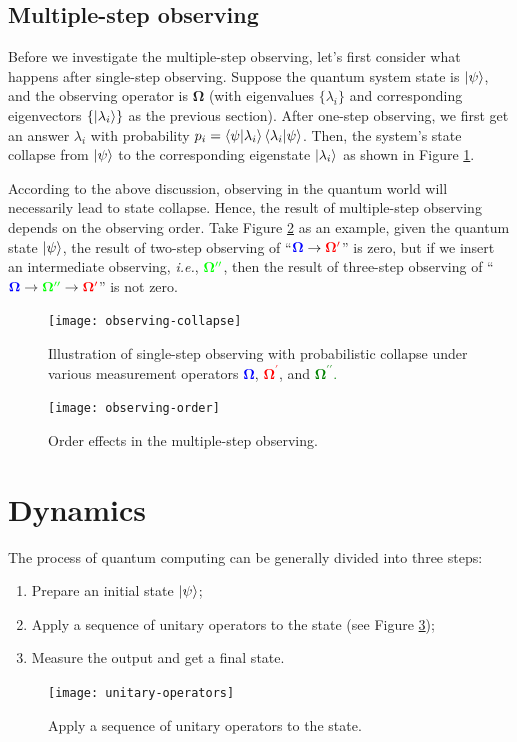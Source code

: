\documentclass{easyclass}
\begin{document}
\subsection{Multiple-step observing}
Before we investigate the multiple-step observing, let's first consider what happens after single-step observing. Suppose the quantum system state is $\ket{\psi}$, and the observing operator is $\mathbf{\Omega}$ (with eigenvalues $\{\lambda_i\}$ and corresponding eigenvectors $\{\ket{\lambda_i}\}$ as the previous section). After one-step observing, we first get an answer $\lambda_i$ with probability $p_i=\braket{\psi|\lambda_i}\braket{\lambda_i|\psi}$. Then, the system's state collapse from $\ket{\psi}$ to the corresponding eigenstate $\ket{\lambda_i}$ as shown in Figure \ref{fig:observing-collapse}.

According to the above discussion, observing in the quantum world will necessarily lead to state collapse. Hence, the result of multiple-step observing depends on the observing order. Take Figure \ref{fig:observing-order} as an example, given the quantum state $\ket{\psi}$, the result of two-step observing of ``$\textcolor{blue}{\mathbf{\Omega}}\rightarrow\textcolor{red}{\mathbf{\Omega}^\prime}$'' is zero, but if we insert an intermediate observing, \textit{i.e.}, $\textcolor{green}{\mathbf{\Omega}^{\prime\prime}}$, then the result of three-step observing of ``$\textcolor{blue}{\mathbf{\Omega}}\rightarrow\textcolor{green}{\mathbf{\Omega}^{\prime\prime}}\rightarrow\textcolor{red}{\mathbf{\Omega}^\prime}$'' is not zero.

\begin{figure}[h]
	\centering
	\texttt{[image: observing-collapse]}
	\caption{
		Illustration of single-step observing with probabilistic collapse under various measurement operators \textcolor{blue}{$\mathbf{\Omega}$}, \textcolor{red}{$\mathbf{\Omega}^\prime$}, and \textcolor{green}{$\mathbf{\Omega}^{\prime\prime}$.}}
	\label{fig:observing-collapse}
\end{figure}

\begin{figure}[h]
	\centering
	\texttt{[image: observing-order]}
	\caption{Order effects in the multiple-step observing.}
	\label{fig:observing-order}
\end{figure}



\section{Dynamics}
The process of quantum computing can be generally divided into three steps:
\begin{enumerate}[(1)]
	\item Prepare an initial state $\ket{\psi}$;
	\item Apply a sequence of unitary operators to the state (see Figure \ref{fig:unitary-operators});
	\item Measure the output and get a final state.
\end{enumerate}

\begin{figure}[h]
	\centering
	\texttt{[image: unitary-operators]}
	\caption{Apply a sequence of unitary operators to the state.}
	\label{fig:unitary-operators}
\end{figure}


\ifx\flag\undefined
	
\end{document}
